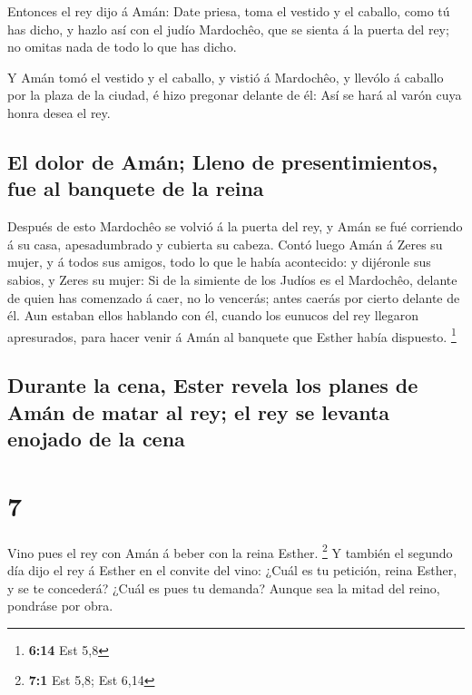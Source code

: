  Entonces el rey dijo á Amán: Date priesa, toma el
vestido y el caballo, como tú has dicho, y hazlo así con el judío
Mardochêo, que se sienta á la puerta del rey; no omitas nada de todo lo
que has dicho.

 Y Amán tomó el vestido y el caballo, y vistió á
Mardochêo, y llevólo á caballo por la plaza de la ciudad, é hizo
pregonar delante de él: Así se hará al varón cuya honra desea el rey.

\hypertarget{el-dolor-de-amuxe1n-lleno-de-presentimientos-fue-al-banquete-de-la-reina}{%
\subsection{El dolor de Amán; Lleno de presentimientos, fue al banquete
de la
reina}\label{el-dolor-de-amuxe1n-lleno-de-presentimientos-fue-al-banquete-de-la-reina}}

 Después de esto Mardochêo se volvió á la puerta del rey,
y Amán se fué corriendo á su casa, apesadumbrado y cubierta su cabeza.
 Contó luego Amán á Zeres su mujer, y á todos sus amigos,
todo lo que le había acontecido: y dijéronle sus sabios, y Zeres su
mujer: Si de la simiente de los Judíos es el Mardochêo, delante de quien
has comenzado á caer, no lo vencerás; antes caerás por cierto delante de
él.  Aun estaban ellos hablando con él, cuando los
eunucos del rey llegaron apresurados, para hacer venir á Amán al
banquete que Esther había dispuesto. \footnote{\textbf{6:14} Est 5,8}

\hypertarget{durante-la-cena-ester-revela-los-planes-de-amuxe1n-de-matar-al-rey-el-rey-se-levanta-enojado-de-la-cena}{%
\subsection{Durante la cena, Ester revela los planes de Amán de matar al
rey; el rey se levanta enojado de la
cena}\label{durante-la-cena-ester-revela-los-planes-de-amuxe1n-de-matar-al-rey-el-rey-se-levanta-enojado-de-la-cena}}

\hypertarget{section-6}{%
\section{7}\label{section-6}}

 Vino pues el rey con Amán á beber con la reina Esther.
\footnote{\textbf{7:1} Est 5,8; Est 6,14}  Y también el
segundo día dijo el rey á Esther en el convite del vino: ¿Cuál es tu
petición, reina Esther, y se te concederá? ¿Cuál es pues tu demanda?
Aunque sea la mitad del reino, pondráse por obra.

